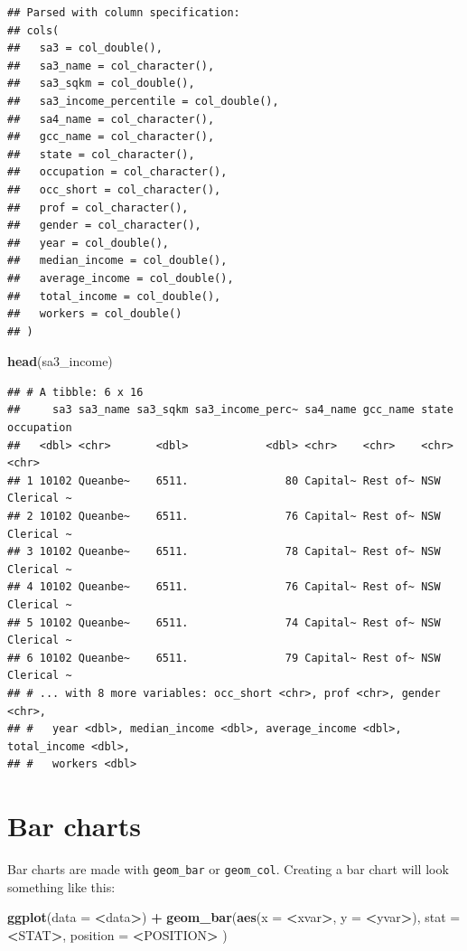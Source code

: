 \documentclass[]{book}
\newenvironment{Shaded}{\begin{snugshade}}{\end{snugshade}}
\newcommand{\DataTypeTok}[1]{\textcolor[rgb]{0.13,0.29,0.53}{#1}}
\newcommand{\KeywordTok}[1]{\textcolor[rgb]{0.13,0.29,0.53}{\textbf{#1}}}
\newcommand{\NormalTok}[1]{#1}
\newcommand{\OperatorTok}[1]{\textcolor[rgb]{0.81,0.36,0.00}{\textbf{#1}}}
\newcommand{\StringTok}[1]{\textcolor[rgb]{0.31,0.60,0.02}{#1}}
\begin{document}
\begin{verbatim}
## Parsed with column specification:
## cols(
##   sa3 = col_double(),
##   sa3_name = col_character(),
##   sa3_sqkm = col_double(),
##   sa3_income_percentile = col_double(),
##   sa4_name = col_character(),
##   gcc_name = col_character(),
##   state = col_character(),
##   occupation = col_character(),
##   occ_short = col_character(),
##   prof = col_character(),
##   gender = col_character(),
##   year = col_double(),
##   median_income = col_double(),
##   average_income = col_double(),
##   total_income = col_double(),
##   workers = col_double()
## )
\end{verbatim}

\begin{Shaded}
\begin{Highlighting}[]
\KeywordTok{head}\NormalTok{(sa3_income)}
\end{Highlighting}
\end{Shaded}

\begin{verbatim}
## # A tibble: 6 x 16
##     sa3 sa3_name sa3_sqkm sa3_income_perc~ sa4_name gcc_name state occupation
##   <dbl> <chr>       <dbl>            <dbl> <chr>    <chr>    <chr> <chr>     
## 1 10102 Queanbe~    6511.               80 Capital~ Rest of~ NSW   Clerical ~
## 2 10102 Queanbe~    6511.               76 Capital~ Rest of~ NSW   Clerical ~
## 3 10102 Queanbe~    6511.               78 Capital~ Rest of~ NSW   Clerical ~
## 4 10102 Queanbe~    6511.               76 Capital~ Rest of~ NSW   Clerical ~
## 5 10102 Queanbe~    6511.               74 Capital~ Rest of~ NSW   Clerical ~
## 6 10102 Queanbe~    6511.               79 Capital~ Rest of~ NSW   Clerical ~
## # ... with 8 more variables: occ_short <chr>, prof <chr>, gender <chr>,
## #   year <dbl>, median_income <dbl>, average_income <dbl>, total_income <dbl>,
## #   workers <dbl>
\end{verbatim}

\hypertarget{bar-charts}{%
\section{Bar charts}\label{bar-charts}}

Bar charts are made with \texttt{geom\_bar} or \texttt{geom\_col}. Creating a bar chart will look something like this:

\begin{Shaded}
\begin{Highlighting}[]
\KeywordTok{ggplot}\NormalTok{(}\DataTypeTok{data =} \OperatorTok{<}\NormalTok{data}\OperatorTok{>}\NormalTok{) }\OperatorTok{+}\StringTok{ }
\StringTok{  }\KeywordTok{geom_bar}\NormalTok{(}\KeywordTok{aes}\NormalTok{(}\DataTypeTok{x =} \OperatorTok{<}\NormalTok{xvar}\OperatorTok{>}\NormalTok{, }\DataTypeTok{y =} \OperatorTok{<}\NormalTok{yvar}\OperatorTok{>}\NormalTok{),}
     \DataTypeTok{stat =} \OperatorTok{<}\NormalTok{STAT}\OperatorTok{>}\NormalTok{, }
     \DataTypeTok{position =} \OperatorTok{<}\NormalTok{POSITION}\OperatorTok{>}
\StringTok{  }\NormalTok{)}
\end{Highlighting}
\end{Shaded}
\end{document}
